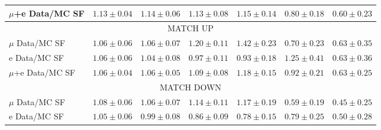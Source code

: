 \begin{table}[!h]
\begin{center}
{\begin{tabular}{l||c||c|c|c|c|c}
\hline
$\mu$+e Data/MC SF 		  & $1.13 \pm 0.04$ & $1.14 \pm 0.06$ & $1.13 \pm 0.08$ & $1.15 \pm 0.14$ & $0.80 \pm 0.18$ & $0.60 \pm 0.23$ \\
\hline
\hline
\multicolumn{7}{c}{MATCH UP} \\
\hline
$\mu$ Data/MC SF 	  & $1.06 \pm 0.06$ & $1.06 \pm 0.07$ & $1.20 \pm 0.11$ & $1.42 \pm 0.23$ & $0.70 \pm 0.23$ & $0.63 \pm 0.35$ \\
\hline
e Data/MC SF 	  & $1.06 \pm 0.06$ & $1.04 \pm 0.08$ & $0.97 \pm 0.11$ & $0.93 \pm 0.18$ & $1.25 \pm 0.41$ & $0.63 \pm 0.36$ \\
\hline
$\mu$+e Data/MC SF 		  & $1.06 \pm 0.04$ & $1.06 \pm 0.05$ & $1.09 \pm 0.08$ & $1.18 \pm 0.15$ & $0.92 \pm 0.21$ & $0.63 \pm 0.25$ \\
\hline
\hline
\multicolumn{7}{c}{MATCH DOWN} \\
\hline
$\mu$ Data/MC SF 	  & $1.08 \pm 0.06$ & $1.06 \pm 0.07$ & $1.14 \pm 0.11$ & $1.17 \pm 0.19$ & $0.59 \pm 0.19$ & $0.45 \pm 0.25$ \\
\hline
e Data/MC SF 	  & $1.05 \pm 0.06$ & $0.99 \pm 0.08$ & $0.86 \pm 0.09$ & $0.78 \pm 0.15$ & $0.79 \pm 0.25$ & $0.50 \pm 0.28$ \\

\end{tabular}}
\end{center}
\end{table}
